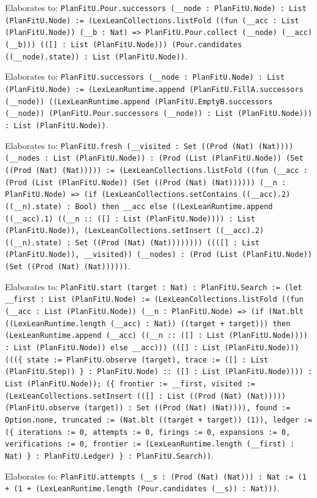 \documentclass[11pt]{article}
\begin{document}
\noindent Elaborates to: \texttt{PlanFitU.Pour.successors (\_\_node : PlanFitU.Node) : List (PlanFitU.Node) := (LexLeanCollections.listFold ((fun (\_\_acc : List (PlanFitU.Node)) (\_\_b : Nat) => PlanFitU.Pour.collect (\_\_node) (\_\_acc) (\_\_b))) (([] : List (PlanFitU.Node))) (Pour.candidates ((\_\_node).state)) : List (PlanFitU.Node))}.\par
\noindent Elaborates to: \texttt{PlanFitU.successors (\_\_node : PlanFitU.Node) : List (PlanFitU.Node) := (LexLeanRuntime.append (PlanFitU.FillA.successors (\_\_node)) ((LexLeanRuntime.append (PlanFitU.EmptyB.successors (\_\_node)) (PlanFitU.Pour.successors (\_\_node)) : List (PlanFitU.Node))) : List (PlanFitU.Node))}.\par
\noindent Elaborates to: \texttt{PlanFitU.fresh (\_\_visited : Set ((Prod (Nat) (Nat)))) (\_\_nodes : List (PlanFitU.Node)) : (Prod (List (PlanFitU.Node)) (Set ((Prod (Nat) (Nat))))) := (LexLeanCollections.listFold ((fun (\_\_acc : (Prod (List (PlanFitU.Node)) (Set ((Prod (Nat) (Nat)))))) (\_\_n : PlanFitU.Node) => (if (LexLeanCollections.setContains ((\_\_acc).2) ((\_\_n).state) : Bool) then \_\_acc else ((LexLeanRuntime.append ((\_\_acc).1) ((\_\_n :: ([] : List (PlanFitU.Node)))) : List (PlanFitU.Node)), (LexLeanCollections.setInsert ((\_\_acc).2) ((\_\_n).state) : Set ((Prod (Nat) (Nat)))))))) ((([] : List (PlanFitU.Node)), \_\_visited)) (\_\_nodes) : (Prod (List (PlanFitU.Node)) (Set ((Prod (Nat) (Nat))))))}.\par
\noindent Elaborates to: \texttt{PlanFitU.start (target : Nat) : PlanFitU.Search := (let \_\_first : List (PlanFitU.Node) := (LexLeanCollections.listFold ((fun (\_\_acc : List (PlanFitU.Node)) (\_\_n : PlanFitU.Node) => (if (Nat.blt ((LexLeanRuntime.length (\_\_acc) : Nat)) ((target + target))) then (LexLeanRuntime.append (\_\_acc) ((\_\_n :: ([] : List (PlanFitU.Node)))) : List (PlanFitU.Node)) else \_\_acc))) (([] : List (PlanFitU.Node))) (((\{ state := PlanFitU.observe (target), trace := ([] : List (PlanFitU.Step)) \} : PlanFitU.Node) :: ([] : List (PlanFitU.Node)))) : List (PlanFitU.Node)); (\{ frontier := \_\_first, visited := (LexLeanCollections.setInsert (([] : List ((Prod (Nat) (Nat))))) (PlanFitU.observe (target)) : Set ((Prod (Nat) (Nat)))), found := Option.none, truncated := (Nat.blt ((target + target)) (1)), ledger := (\{ iterations := 0, attempts := 0, firings := 0, expansions := 0, verifications := 0, frontier := (LexLeanRuntime.length (\_\_first) : Nat) \} : PlanFitU.Ledger) \} : PlanFitU.Search))}.\par
\noindent Elaborates to: \texttt{PlanFitU.attempts (\_\_s : (Prod (Nat) (Nat))) : Nat := (1 + (1 + (LexLeanRuntime.length (Pour.candidates (\_\_s)) : Nat)))}.\par
\end{document}
